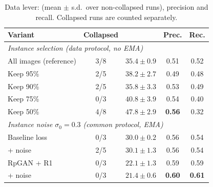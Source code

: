 \begin{table}[t]
\centering
\small
\setlength{\tabcolsep}{4pt}
\caption{Data lever: \finc{} (mean $\pm$ s.d.\ over non-collapsed runs), precision and recall. Collapsed runs are counted separately.}
\label{tab:data}
\begin{tabular}{lcccc}
\toprule
Variant & Collapsed & \finc{} & Prec. & Rec.\\
\midrule
\multicolumn{5}{l}{\emph{Instance selection (data protocol, no EMA)}}\\
All images (reference) & 3/8 & $35.4\pm0.9$ & 0.51 & 0.52\\
Keep 95\% & 2/5 & $38.2\pm2.7$ & 0.49 & 0.48\\
Keep 90\% & 2/5 & $35.8\pm3.3$ & 0.53 & 0.49\\
Keep 75\% & 0/3 & $40.8\pm3.9$ & 0.54 & 0.40\\
Keep 50\% & 4/8 & $47.8\pm2.9$ & \textbf{0.56} & 0.32\\
\midrule
\multicolumn{5}{l}{\emph{Instance noise $\sigma_0=0.3$ (common protocol, EMA)}}\\
Baseline loss & 0/3 & $30.0\pm0.2$ & 0.56 & 0.54\\
\quad + noise & 2/5 & $30.1\pm1.3$ & 0.56 & 0.54\\
RpGAN + R1 & 0/3 & $22.1\pm1.3$ & 0.59 & 0.59\\
\quad + noise & 0/3 & $21.4\pm0.6$ & \textbf{0.60} & \textbf{0.61}\\
\bottomrule
\end{tabular}
\end{table}
